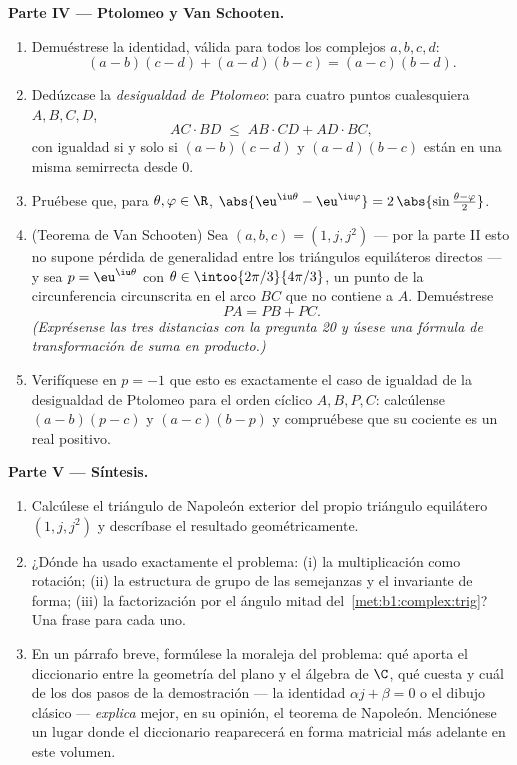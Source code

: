 \begin{problem}
\medskip
\noindent\textbf{Parte IV --- Ptolomeo y Van Schooten.}
\begin{enumerate}[resume]
  \item Demuéstrese la identidad, válida para todos los complejos $a, b, c, d$:
        \[
        (a - b)(c - d) + (a - d)(b - c) = (a - c)(b - d) .
        \]
  \item Dedúzcase la \emph{desigualdad de
        Ptolomeo}: para cuatro puntos
        cualesquiera $A, B, C, D$,
        \[
        AC \cdot BD \;\leq\; AB \cdot CD + AD \cdot BC ,
        \]
        con igualdad si y solo si $(a-b)(c-d)$ y $(a-d)(b-c)$ están
        en una misma semirrecta desde $0$.
  \item Pruébese que, para $\theta, \varphi \in \R$,
        $\abs{\eu^{\iu\theta} - \eu^{\iu\varphi}} =
        2\,\abs{\sin\frac{\theta - \varphi}2}$.
  \item (Teorema de Van Schooten) Sea
        $(a, b, c) = (1, j, j^2)$ --- por la parte II esto no supone
        pérdida de generalidad entre los triángulos equiláteros
        directos --- y sea $p = \eu^{\iu\theta}$ con $\theta \in
        \intoo{2\pi/3}{4\pi/3}$, un punto de la circunferencia
        circunscrita en el arco $BC$ que no contiene a $A$. Demuéstrese
        \[
        PA = PB + PC .
        \]
        \emph{(Exprésense las tres distancias con la pregunta 20 y
        úsese una fórmula de transformación de suma en producto.)}
  \item Verifíquese en $p = -1$ que esto es exactamente el caso de
        igualdad de la desigualdad de Ptolomeo para el orden cíclico
        $A, B, P, C$: calcúlense $(a - b)(p - c)$ y $(a - c)(b - p)$ y
        compruébese que su cociente es un real positivo.
\end{enumerate}

\medskip
\noindent\textbf{Parte V --- Síntesis.}
\begin{enumerate}[resume]
  \item Calcúlese el triángulo de Napoleón exterior del propio
        triángulo equilátero $(1, j, j^2)$ y descríbase el resultado
        geométricamente.
  \item ¿Dónde ha usado exactamente el problema: (i) la multiplicación
        como rotación; (ii) la estructura de grupo de las semejanzas y
        el invariante de forma; (iii) la factorización por el ángulo
        mitad del~\cref{met:b1:complex:trig}? Una frase para cada uno.
  \item En un párrafo breve, formúlese la moraleja del problema: qué
        aporta el diccionario entre la geometría del plano y el álgebra
        de $\C$, qué cuesta y cuál de los dos pasos de la demostración
        --- la identidad $\alpha j + \beta = 0$ o el dibujo clásico ---
        \emph{explica} mejor, en su opinión, el teorema de Napoleón.
        Menciónese un lugar donde el diccionario reaparecerá en forma
        matricial más adelante en este volumen.
\end{enumerate}
\end{problem}
